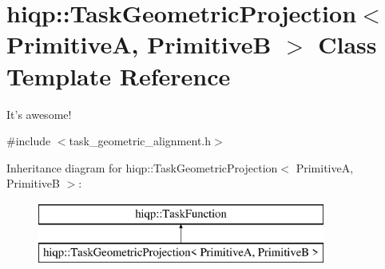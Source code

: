 \hypertarget{classhiqp_1_1TaskGeometricProjection}{\section{hiqp\-:\-:Task\-Geometric\-Projection$<$ Primitive\-A, Primitive\-B $>$ Class Template Reference}
\label{classhiqp_1_1TaskGeometricProjection}
}


It's awesome!  




{\ttfamily \#include $<$task\-\_\-geometric\-\_\-alignment.\-h$>$}

Inheritance diagram for hiqp\-:\-:Task\-Geometric\-Projection$<$ Primitive\-A, Primitive\-B $>$\-:\begin{figure}[H]
\begin{center}
\leavevmode
\includegraphics[height=2.000000cm]{classhiqp_1_1TaskGeometricProjection}
\end{center}
\end{figure}
